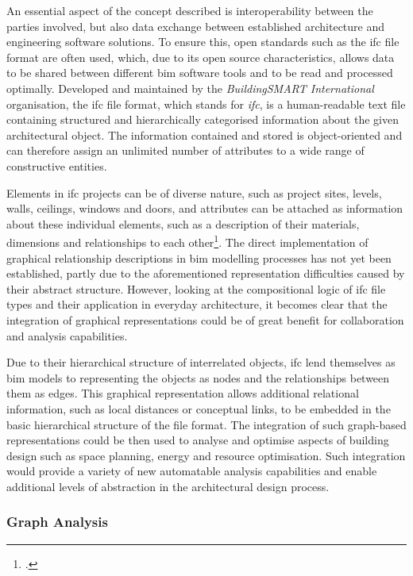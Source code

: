 \documentclass[a4paper, 12pt]{report}
\begin{document}
An essential aspect of the concept described is interoperability between the parties involved, but also data exchange between established architecture and engineering software solutions. To ensure this, open standards such as the \acrshort{ifc} file format are often used, which, due to its \gls{open source} characteristics, allows data to be shared between different \acrshort{bim} software tools and to be read and processed optimally. Developed and maintained by the \textit{BuildingSMART International} organisation, the \acrshort{ifc} file format, which stands for \textit{\acrlong{ifc}}, is a human-readable text file containing structured and hierarchically categorised information about the given architectural object. The information contained and stored is object-oriented and can therefore assign an unlimited number of attributes to a wide range of constructive entities.

Elements in \acrshort{ifc} projects can be of diverse nature, such as project sites, levels, walls, ceilings, windows and doors, and attributes can be attached as information about these individual elements, such as a description of their materials, dimensions and relationships to each other\footcite{schultz2011toward}. The direct implementation of graphical relationship descriptions in \acrshort{bim} modelling processes has not yet been established, partly due to the aforementioned representation difficulties caused by their abstract structure. However, looking at the compositional logic of \acrshort{ifc} file types and their application in everyday architecture, it becomes clear that the integration of graphical representations could be of great benefit for collaboration and analysis capabilities.

Due to their hierarchical structure of interrelated objects, \acrlong{ifc} lend themselves as \acrshort{bim} models to representing the objects as nodes and the relationships between them as edges. This graphical representation allows additional relational information, such as local distances or conceptual links, to be embedded in the basic hierarchical structure of the file format. The integration of such graph-based representations could be then used to analyse and optimise aspects of building design such as space planning, energy and resource optimisation. Such integration would provide a variety of new automatable analysis capabilities and enable additional levels of abstraction in the architectural design process.

\subsubsection{Graph Analysis}\label{subsec:graph-analysis}
\end{document}
